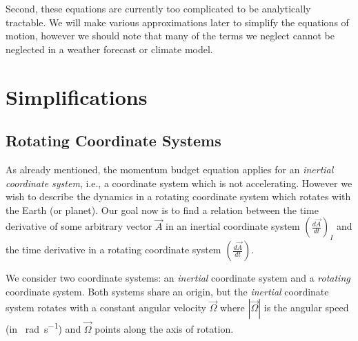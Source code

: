 Second, these equations are currently too complicated to be analytically tractable. We will make various approximations later to simplify the equations of motion, however we should note that many of the terms we neglect cannot be neglected in a weather forecast or climate model.

\section{Simplifications}

\subsection{Rotating Coordinate Systems}

As already mentioned, the momentum budget equation applies for an \textit{inertial coordinate system}, i.e., a coordinate system which is not accelerating. However we wish to describe the dynamics in a rotating coordinate system which rotates with the Earth (or planet). Our goal now is to  find a relation between the time derivative of some arbitrary vector $\vec{A}$ in an inertial coordinate system $\left(\frac{d\vec{A}}{dt}\right)_I$ and the time derivative in a rotating coordinate system $\left(\frac{d\vec{A}}{dt}\right)$.

We consider two coordinate systems: an \textit{inertial} coordinate system and a \textit{rotating} coordinate system. Both systems share an origin, but the \textit{inertial} coordinate system rotates with a constant angular velocity $\vec{\Omega}$ where $|\vec{\Omega}|$ is the angular speed (in \qty{}{\radian\per\second}) and $\vec{\Omega}$ points along the axis of rotation.

